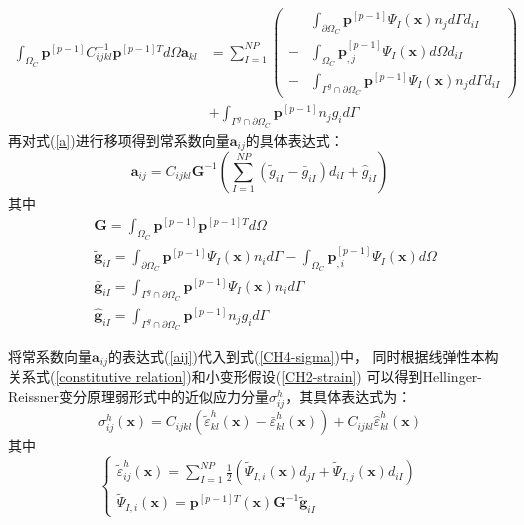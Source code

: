 \begin{equation}\label{a}
\begin{split}
        \int_{\Omega_C}\pmb{p}^{[p-1]}C^{-1}_{ijkl}\pmb{p}^{[p-1]T}d\Omega\pmb{a}_{kl}&=\sum_{I=1}^{N\!P}
        \left (
            \begin{split}
                &\int_{\partial\Omega_C}\pmb{p}^{[p-1]}\Psi_I(\pmb{x})n_jd\Gamma d_{iI} \\
               -&\int_{\Omega_C}\pmb{p}_{,j}^{[p-1]}\Psi_{I}(\pmb{x})d\Omega d_{iI}\\
               -&\int_{\Gamma^g\cap\partial\Omega_C}\pmb{p}^{[p-1]}\Psi_I(\pmb{x})n_jd\Gamma d_{iI}
            \end{split}
         \right ) \\
         &+\int_{\Gamma^g\cap\partial\Omega_C}\pmb{p}^{[p-1]}n_jg_id\Gamma
\end{split}
\end{equation}
再对式(\ref{a})进行移项得到常系数向量$\pmb{a}_{ij}$的具体表达式：
\begin{equation}\label{aij}
 \pmb{a}_{ij}=C_{ijkl}\pmb{G}^{-1}(\sum_{I=1}^{N\!P}(\tilde{g}_{iI}-\bar{g}_{iI})d_{iI}+\hat{g}_{iI})
\end{equation}
其中
\begin{align}
    \label{g1}&\pmb{G}=\int_{\Omega_C}\pmb{p}^{[p-1]}\pmb{p}^{[p-1]T}d\Omega\\
    \label{g2} &\tilde{\pmb g}_{iI}=\int_{\partial\Omega_C}\pmb{p}^{[p-1]}\Psi_I(\pmb{x})n_id\Gamma-\int_{\Omega_C}\pmb{p}_{,i}^{[p-1]}\Psi_{I}(\pmb{x})d\Omega\\
    \label{g3} &\bar{\pmb g}_{iI}=\int_{\Gamma^g\cap\partial\Omega_C}\pmb{p}^{[p-1]}\Psi_I(\pmb{x})n_id\Gamma\\
   \label{g4} &\hat{\pmb g}_{iI}=\int_{\Gamma^g\cap\partial\Omega_C}\pmb{p}^{[p-1]}n_jg_id\Gamma
\end{align}\par
将常系数向量$\pmb{a}_{ij}$的表达式(\ref{aij})代入到式(\ref{CH4-sigma})中，
同时根据线弹性本构关系式(\ref{constitutive relation})和小变形假设(\ref{CH2-strain})
可以得到Hellinger-Reissner变分原理弱形式中的近似应力分量$\sigma^h_{ij}$，其具体表达式为：
\begin{equation}\label{sigmah}
    \sigma^h_{ij}(\pmb{x})=C_{ijkl}(\tilde{\varepsilon}^h_{kl}(\pmb{x})-\bar{\varepsilon}^h_{kl}(\pmb{x}))+C_{ijkl}\hat{\varepsilon}^h_{kl}(\pmb{x})
\end{equation}
其中
\begin{equation}
\begin{cases}\label{case1}
    \tilde{\varepsilon}^h_{ij}(\pmb{x})=\displaystyle\sum_{I=1}^{N\!P}\frac{1}{2}(\tilde{\Psi}_{I,i}(\pmb{x})d_{jI}+\tilde{\Psi}_{I,j}(\pmb{x})d_{iI})\\
    \tilde{\Psi}_{I,i}(\pmb{x})=\pmb{p}^{[p-1]T}(\pmb{x})\pmb{G}^{-1}\tilde{\pmb g}_{iI}
\end{cases}
\end{equation}
